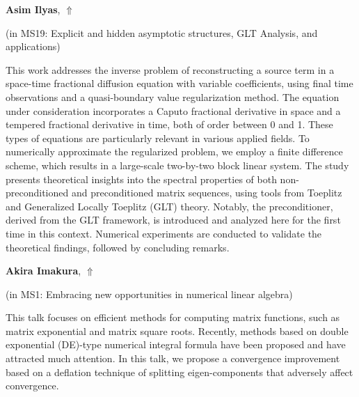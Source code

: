 \documentclass[ILAS2025-program.tex]{subfiles}
\begin{document}
\hypertarget{down0176}{}\begin{ilasabstract}
    
\textbf{Asim Ilyas},  \hfill \hyperlink{up0176}{$\Uparrow$}
    
    
(in {\color{mstitle}MS19: Explicit and hidden asymptotic structures, GLT Analysis, and applications})
        
\mtskip
    This work addresses the inverse problem of reconstructing a source term in a space-time fractional diffusion equation with variable coefficients, using final time observations and a quasi-boundary value regularization method. The equation under consideration incorporates a Caputo fractional derivative in space and a tempered fractional derivative in time, both of order between 0 and 1. These types of equations are particularly relevant in various applied fields. To numerically approximate the regularized problem, we employ a finite difference scheme, which results in a large-scale two-by-two block linear system. The study presents theoretical insights into the spectral properties of both non-preconditioned and preconditioned matrix sequences, using tools from Toeplitz and Generalized Locally Toeplitz (GLT) theory. Notably, the preconditioner, derived from the GLT framework, is introduced and analyzed here for the first time in this context. Numerical experiments are conducted to validate the theoretical findings, followed by concluding remarks.
\end{ilasabstract}
    

\hypertarget{down0349}{}\begin{ilasabstract}
    
\textbf{Akira Imakura},  \hfill \hyperlink{up0349}{$\Uparrow$}
    
    
(in {\color{mstitle}MS1: Embracing new opportunities in numerical linear algebra})
        
\mtskip
    This talk focuses on efficient methods for computing matrix functions, such as matrix exponential and matrix square roots.
Recently, methods based on double exponential (DE)-type numerical integral formula have been proposed and have attracted much attention.
In this talk, we propose a convergence improvement based on a deflation technique of splitting eigen-components that adversely affect convergence.
\end{ilasabstract}
    
\end{document}
